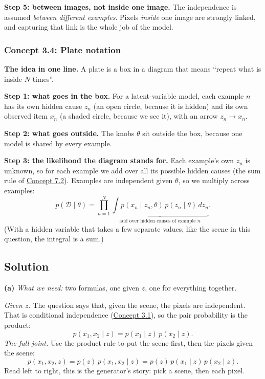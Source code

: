 \documentclass[12pt,a4paper]{article}
\begin{document}
\textbf{Step 5: between images, not inside one image.} The independence is assumed \emph{between different examples}. Pixels \emph{inside} one image are strongly linked, and capturing that link is the whole job of the model.

\subsubsection{Concept 3.4: Plate notation}\label{c3-4}

\textbf{The idea in one line.} A plate is a box in a diagram that means ``repeat what is inside $N$ times''.

\textbf{Step 1: what goes in the box.} For a latent-variable model, each example $n$ has its own hidden cause $z_n$ (an open circle, because it is hidden) and its own observed item $x_n$ (a shaded circle, because we see it), with an arrow $z_n\to x_n$.

\textbf{Step 2: what goes outside.} The knobs $\theta$ sit outside the box, because one model is shared by every example.

\textbf{Step 3: the likelihood the diagram stands for.} Each example's own $z_n$ is unknown, so for each example we add over all its possible hidden causes (the sum rule of \hyperref[c7-2]{Concept 7.2}). Examples are independent given $\theta$, so we multiply across examples:
\[
p(\mathcal{D}\mid\theta)=\prod_{n=1}^{N}\underbrace{\int p(x_n\mid z_n,\theta)\,p(z_n\mid\theta)\,dz_n}_{\text{add over hidden causes of example }n} .
\]
(With a hidden variable that takes a few separate values, like the scene in this question, the integral is a sum.)

\subsection{Solution}

\textbf{(a)} \emph{What we need:} two formulas, one given $z$, one for everything together.

\emph{Given $z$.} The question says that, given the scene, the pixels are independent. That is conditional independence (\hyperref[c3-1]{Concept 3.1}), so the pair probability is the product:
\[
p(x_1,x_2\mid z)=p(x_1\mid z)\,p(x_2\mid z).
\]
\emph{The full joint.} Use the product rule to put the scene first, then the pixels given the scene:
\[
p(x_1,x_2,z)=p(z)\,p(x_1,x_2\mid z)=p(z)\,p(x_1\mid z)\,p(x_2\mid z).
\]
Read left to right, this is the generator's story: pick a scene, then each pixel.
\end{document}
